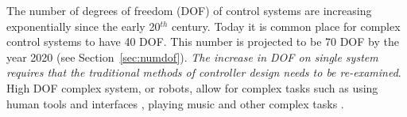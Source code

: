 The number of degrees of freedom (DOF) of control systems are increasing exponentially since the early 20$^{th}$ century.
Today it is common place for complex control systems to have 40 DOF. 
This number is projected to be 70 DOF by the year 2020 (see Section~\ref{sec:numdof}).
\textit{The increase in DOF on single system requires that the traditional methods of controller design needs to be re-examined}.
High DOF complex system, or robots, allow for complex tasks such as using human tools and interfaces \cite{lofaroRAM2013,lofaroTePRA2013HuboAch,lofaroTePRA2013Valve,gtechIK}, playing music \cite{lofaroEURASIP2011, 6094987,lofaroIASTED2011,5686847} and other complex tasks \cite{lofaroHumanoids2012,lofaroGamesRobot,tepraLadder2013}.

\cite{orocos-gadeyne-ijrr2005}
\cite{multiPC-arch-1185243}
\cite{multi-thread-robot-5602743}
\cite{multi-thread-snake-1541141}
\cite{multi-thread-5524083}
\cite{openHRP}
\cite{Webots}




